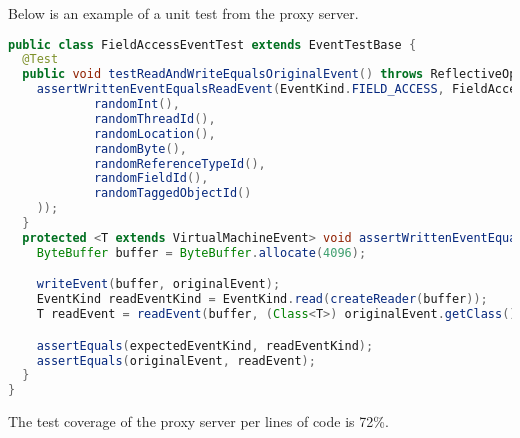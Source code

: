 \documentclass[..thesis.tex]{subfiles}
\begin{document}
Below is an example of a unit test from the proxy server.

\begin{lstlisting}[language=Java, caption={\textit{A unit test testing whether reading and writing a data field of a particular JVM event returns identical bytes to the original event.}}, captionpos=b]
public class FieldAccessEventTest extends EventTestBase {
  @Test
  public void testReadAndWriteEqualsOriginalEvent() throws ReflectiveOperationException {
    assertWrittenEventEqualsReadEvent(EventKind.FIELD_ACCESS, FieldAccessEvent.create(
            randomInt(),
            randomThreadId(),
            randomLocation(),
            randomByte(),
            randomReferenceTypeId(),
            randomFieldId(),
            randomTaggedObjectId()
    ));
  }
  protected <T extends VirtualMachineEvent> void assertWrittenEventEqualsReadEvent(EventKind expectedEventKind, T originalEvent) throws ReflectiveOperationException {
    ByteBuffer buffer = ByteBuffer.allocate(4096);

    writeEvent(buffer, originalEvent);
    EventKind readEventKind = EventKind.read(createReader(buffer));
    T readEvent = readEvent(buffer, (Class<T>) originalEvent.getClass());

    assertEquals(expectedEventKind, readEventKind);
    assertEquals(originalEvent, readEvent);
  }
}
\end{lstlisting}

The test coverage of the proxy server per lines of code is 72\%.
\end{document}

